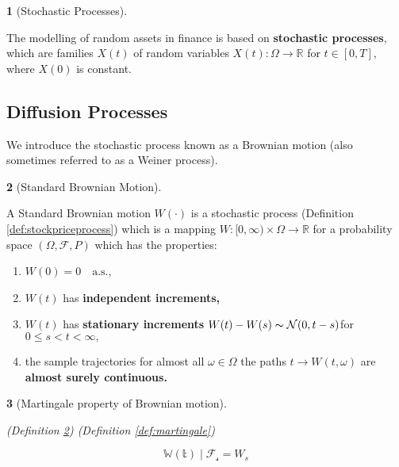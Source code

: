 \documentclass[british]{amsart}
\numberwithin{equation}{section}
\numberwithin{figure}{section}
\theoremstyle{plain}
\newtheorem{thm}{\protect\theoremname}[section]
\theoremstyle{definition}
\newtheorem{defn}[thm]{\protect\definitionname}
\theoremstyle{plain}
\theoremstyle{plain}
\theoremstyle{plain}
\theoremstyle{remark}
\theoremstyle{plain}
\providecommand{\definitionname}{Definition}
\providecommand{\theoremname}{Theorem}
\newcommand{\filtration}[1]{\mathcal{F_{#1}}}
\newcommand{\almostsurely}{\text{a.s.}}
\newcommand{\E}[1]{\mathbb{#1}}
\begin{document}
\begin{defn} [Stochastic Processes]
	\label{def:stochasticprocesses}

	The modelling of random assets in finance is based on \textbf{stochastic
	processes}, which are families $X(t)$  of random variables $X(t):\Omega\to\mathbb{R}$
	for $t\in[0,T]$, where $X(0)$ is constant.

\end{defn}

\subsection{Diffusion Processes}

We introduce the stochastic process known as a Brownian motion (also sometimes 
referred to as a Weiner process).

\begin{defn} [Standard Brownian Motion]
	\label{def:brownianmotion}

	A Standard Brownian motion $W(\cdot)$ is a stochastic process 
	(Definition \ref{def:stockpriceprocess})  which is a 	mapping 
	$W:[0,\infty)\times\Omega\to\mathbb{R}$ for a probability	space 
	$(\Omega,\mathcal{F},P)$ which has the properties: 

	\begin{enumerate}
		\item $W(0)=0 \quad \almostsurely$,
		\item $W(t)$ has \textbf{independent increments,}
		\item $W(t)$ has \textbf{stationary increments} 
			$W(t)-W(s)\thicksim\mathcal{N}(0,t-s)$for $0\le s<t<\infty,$
		\item the sample trajectories for almost all $\omega\in\Omega$ the paths 
			$t\to W(t,\omega)$ are \textbf{almost surely continuous.}
	\end{enumerate}

\end{defn}

\begin{thm} [Martingale property of Brownian motion]
	\label{tmh:brownianmotionmartingaleproperty}

	(Definition \ref{def:brownianmotion})
	(Definition \ref{def:martingale})

	\begin{equation*}
		\E{W(t) \mid \filtration{s}} = W_{s}
	\end{equation*}

\end{thm}
\end{document}

